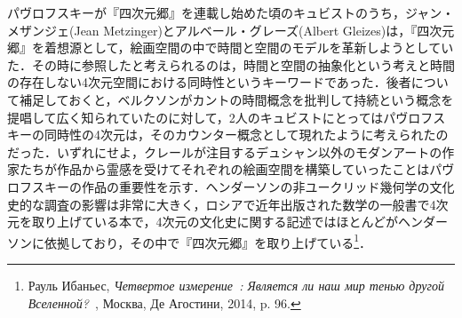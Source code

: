 パヴロフスキーが『四次元郷』を連載し始めた頃のキュビストのうち，ジャン・メザンジェ(Jean Metzinger)とアルベール・グレーズ(Albert Gleizes)は，『四次元郷』を着想源として，絵画空間の中で時間と空間のモデルを革新しようとしていた．その時に参照したと考えられるのは，時間と空間の抽象化という考えと時間の存在しない4次元空間における同時性というキーワードであった．後者について補足しておくと，ベルクソンがカントの時間概念を批判して持続という概念を提唱して広く知られていたのに対して，2人のキュビストにとってはパヴロフスキーの同時性の4次元は，そのカウンター概念として現れたように考えられたのだった．いずれにせよ，クレールが注目するデュシャン以外のモダンアートの作家たちが作品から霊感を受けてそれぞれの絵画空間を構築していったことはパヴロフスキーの作品の重要性を示す．ヘンダーソンの非ユークリッド幾何学の文化史的な調査の影響は非常に大きく，ロシアで近年出版された数学の一般書で4次元を取り上げている本で，4次元の文化史に関する記述ではほとんどがヘンダーソンに依拠しており，その中で『四次元郷』を取り上げている\footnote{\foreignlanguage{russian}{Рауль Ибаньес, \emph{Четвертое измерение~: Является ли наш мир тенью другой Вселенной?~}, Москва, Де Агостини}, 2014, p. 96.}．

